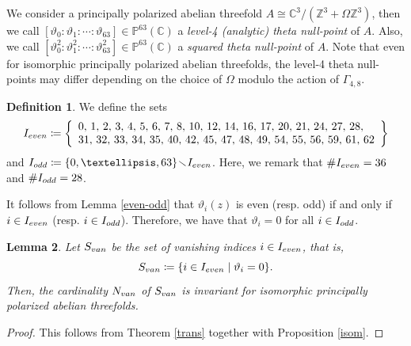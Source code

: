 \documentclass{amsart}
\theoremstyle{definition}
\newtheorem{Def}{Definition}[section]
\theoremstyle{plain}
\newtheorem{Lem}[Def]{Lemma}
\begin{document}
We consider a principally polarized abelian threefold $A \cong \mathbb{C}^3/(\mathbb{Z}^3+\varOmega\mathbb{Z}^3)$, then we call $[\vartheta_0:\vartheta_1:\cdots:\vartheta_{63}] \in \mathbb{P}^{63}(\mathbb{C})$ a \emph{level-4 (analytic) theta null-point} of $A$. Also, we call $[\vartheta_0^2:\vartheta_1^2:\cdots:\vartheta_{63}^2] \in \mathbb{P}^{63}(\mathbb{C})$ a \emph{squared theta null-point} of $A$.
Note that even for isomorphic principally polarized abelian threefolds, the level-4 theta null-points may differ depending on the choice of $\varOmega$ modulo the action of $\varGamma_{4,8}$.
\begin{Def}
We define the sets\smallskip
\[
    I_{\rm even} \coloneqq \left\{
    \begin{array}{l}
        0,\,1,\,2,\,3,\,4,\,5,\,6,\,7,\,8,\,10,\,12,\,14,\,16,\,17,\,20,\,21,\,24,\,27,\,28,\\
        31,\,32,\,33,\,34,\,35,\,40,\,42,\,45,\,47,\,48,\,49,\,54,\,55,\,56,\,59,\,61,\,62
    \end{array}
    \right\}
\]
and $I_{\rm odd} \coloneqq \{0,\ldots,63\}\!\smallsetminus\!I_{\rm even}$.
Here, we remark that $\#I_{\rm even} = 36$ and $\#I_{\rm odd} = 28$.
\end{Def}\smallskip

It follows from Lemma \ref{even-odd} that $\vartheta_i(z)$ is even (resp. odd) if and only if $i \in I_{\rm even}$ (resp. $i \in I_{\rm odd}$).
Therefore, we have that $\vartheta_i = 0$ for all $i \in I_{\rm odd}$.
\begin{Lem}\label{invariant}
Let $S_{\rm van}$ be the set of vanishing indices $i \in I_{\rm even}$, that is,
\[
    S_{\rm van} \coloneqq \{i \in I_{\rm even} \mid \vartheta_i = 0\}.\smallskip
\]
Then, the cardinality $N_{\rm van}$ of $S_{\rm van}$ is invariant for isomorphic principally polarized abelian threefolds.
\end{Lem}
\begin{proof}
This follows from Theorem \ref{trans} together with Proposition \ref{isom}.
\end{proof}
\end{document}
